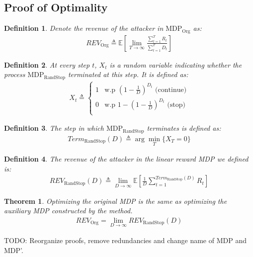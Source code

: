 \documentclass{article}
\newcommand{\E}[1]{\mathbb{E} \left[ #1 \right]}
\newcommand{\orgmdp}{\text{MDP}_\text{Org}}
\newcommand{\auxmdp}{\text{MDP}_\text{RandStop}}
\newcommand{\revorg}{\textit{REV}_\text{Org}}
\newcommand{\revaux}{\textit{REV}_\text{RandStop}}
\newcommand{\termaux}{\textit{Term}_\text{RandStop}}
\newtheorem{definition}{Definition}
\newtheorem{theorem}{Theorem}
\begin{document}
\subsection{Proof of Optimality}
\begin{definition}
    Denote the revenue of the attacker in $\orgmdp$ as:
    \begin{gather*}
        \revorg \triangleq \E{\lim\limits_{T\to\infty} \frac{\sum\limits_{t=1}^T R_t}{\sum\limits_{t=1}^T D_t}}
    \end{gather*}
\end{definition}
\begin{definition}
    At every step $t$, $X_t$ is a random variable indicating whether the process $\auxmdp$ terminated at this step. It is defined as:
    \begin{gather*}
        X_t \triangleq
        \begin{cases}
            1 & \text{w.p } \left( 1 -\frac{1}{D} \right)^{D_t} \text{ (continue)} \\
            0 & \text{w.p } 1 - \left( 1 -\frac{1}{D} \right)^{D_t} \text{ (stop)} \\
            \end{cases}
    \end{gather*}
\end{definition}
\begin{definition}
    The step in which $\auxmdp$ terminates is defined as:
    \begin{gather*}
        \termaux(D) \triangleq \arg \min\limits_T \{ X_T = 0 \}
    \end{gather*}
\end{definition}
\begin{definition}
    The revenue of the attacker in the linear reward MDP we defined is:
    \begin{gather*}
         \revaux(D) \triangleq \lim\limits_{D\to\infty} \E{\frac{1}{D}\sum\limits_{t=1}^{\termaux(D)} R_t}
    \end{gather*}
\end{definition}
\begin{theorem}
    Optimizing the original MDP is the same as optimizing the auxiliary MDP constructed by the method.
    \begin{gather*}
        \revorg = \lim\limits_{D\to\infty}  \revaux(D)
    \end{gather*}
\end{theorem}

TODO: Reorganize proofs, remove redundancies and change name of MDP and MDP'.
\end{document}
